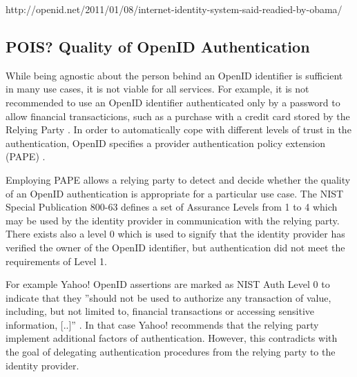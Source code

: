 \documentclass[english,gradu]{tktltiki}
\begin{document}
http://openid.net/2011/01/08/internet-identity-system-said-readied-by-obama/



\subsection{POIS? Quality of OpenID Authentication} %
\label{sub:quality_of_openid_authentication}

   While being agnostic about the person behind an OpenID identifier is sufficient in many use cases, it is not viable for all services. For example, it is not recommended to use an OpenID identifier authenticated only by a password to allow financial transacticions, such as a purchase with a credit card stored by the Relying Party \cite{yahoo_openid_bestpractices_2010}. In order to automatically cope with different levels of trust in the authentication, OpenID specifies a provider authentication policy extension (PAPE) \cite{openid_2.0_specification_07, openid_2.0_pape_07}.

   Employing PAPE allows a relying party to detect and decide whether the quality of an OpenID authentication is appropriate for a particular use case. The NIST Special Publication 800-63 \cite{NIST_SP800-63} defines a set of Assurance Levels from 1 to 4 which may be used by the identity provider in communication with the relying party. There exists also a level 0 which is used to signify that the identity provider has verified the owner of the OpenID identifier, but authentication did not meet the requirements of Level 1.

   For example Yahoo! OpenID assertions are marked as NIST Auth Level 0 to indicate that they ''should not be used to authorize any transaction of value, including, but not limited to, financial transactions or accessing sensitive information, [..]'' \cite{yahoo_openid_bestpractices_2010}. In that case Yahoo! recommends that the relying party implement additional factors of authentication. However, this contradicts with the goal of delegating authentication procedures from the relying party to the identity provider.



\end{document}
